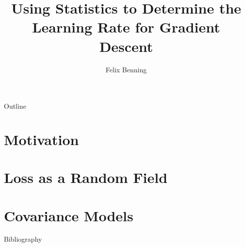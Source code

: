 \documentclass[
	handout,
	hyperref={unicode, colorlinks=true, linkcolor=.}
]{beamer}
\title{Using Statistics to Determine the Learning Rate for Gradient Descent}
\author{Felix Benning}
\institute{University of Mannheim}
\begin{document}
	\frame{\titlepage}

	\begin{frame}{Outline}
		\tableofcontents
	\end{frame}


	\section{Motivation}

	
	
	
	

	\section{Loss as a Random Field}

	
	

	\section{Covariance Models}


	\appendix

	\begin{frame}{Bibliography}
		\printbibliography
	\end{frame}
\end{document}
